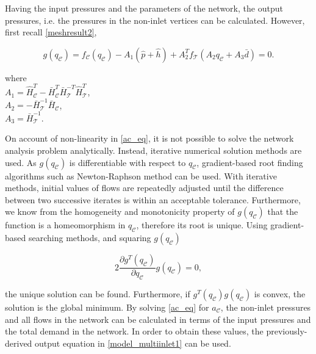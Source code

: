 Having the input pressures and the parameters of the network, the output pressures, i.e. the pressures in the non-inlet vertices can be calculated. However, first recall \eqref{meshresult2}, 

\begin{equation}
  \label{ac_eq} 
  g(q_{\mathcal{C}}) = f_{\mathcal{C}}(q_\mathcal{C}) - A_1(\hat{p} + \hat{h}) + A_2^T f_{\mathcal{T}}(A_2 q_\mathcal{C} + A_3 \bar{d}) = 0.
\end{equation}

\begin{minipage}[t]{0.4\textwidth}
where\\
\hspace*{8mm} $A_1 = \hat{H}^T_{\mathcal{C}} -\bar{H}^T_{\mathcal{C}}\bar{H}^{-T}_{\mathcal{T}}\hat{H}^T_{\mathcal{T}}$, \vspace*{1.5mm}  \\
\hspace*{8mm} $A_2 = -\bar{H}^{-1}_{\mathcal{T}} \bar{H}_{\mathcal{C}} $, \vspace*{1.5mm}\\
\hspace*{8mm} $A_3 = \bar{H}^{-1}_{\mathcal{T}}$. 
\end{minipage}

On account of non-linearity in \eqref{ac_eq},  it is not possible to solve the network analysis problem analytically. Instead, iterative numerical solution methods are used. As $g(q_{\mathcal{C}})$ is differentiable with respect to $q_{\mathcal{C}}$, gradient-based root finding algorithms such as Newton-Raphson method can be used. With iterative methods, initial values of flows are repeatedly adjusted until the difference between two successive iterates is within an acceptable tolerance.  Furthermore, we know from the homogeneity and monotonicity property of $g(q_{\mathcal{C}})$ that the function is a homeomorphism in $q_{\mathcal{C}}$, therefore its root is unique. Using gradient-based searching methods, and squaring $g(q_{\mathcal{C}})$ 

\begin{equation}
\label{gradient_search} 
  2 \frac{\partial g^T(q_{\mathcal{C}})}{\partial q_{\mathcal{C}}} g(q_{\mathcal{C}}) = 0, 
\end{equation}

the unique solution can be found. Furthermore, if $g^T(q_{\mathcal{C}}) g(q_{\mathcal{C}})$ is convex, the solution is the global minimum. By solving \eqref{ac_eq} for $a_{\mathcal{C}}$, the non-inlet pressures and all flows in the network can be calculated in terms of the input pressures and the total demand in the network. In order to obtain these values, the previously-derived output equation in \eqref{model_multiinlet1} can be used. 

